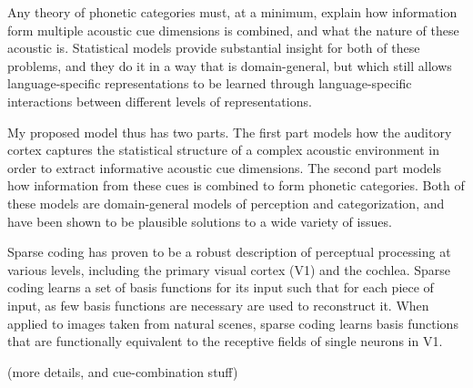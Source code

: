 \documentclass[12pt]{article}
\begin{document}

% 

Any theory of phonetic categories must, at a minimum, explain how information form multiple acoustic cue dimensions is combined, and what the nature of these acoustic is.  Statistical models provide substantial insight for both of these problems, and they do it in a way that is domain-general, but which still allows language-specific representations to be learned through language-specific interactions between different levels of representations.  

My proposed model thus has two parts.  The first part models how the auditory cortex captures the statistical structure of a complex acoustic environment in order to extract informative acoustic cue dimensions.  The second part models how information from these cues is combined to form phonetic categories.  Both of these models are domain-general models of perception and categorization, and have been shown to be plausible solutions to a wide variety of issues.

Sparse coding \cite{Olshausen1996} has proven to be a robust description of perceptual processing at various levels, including the primary visual cortex (V1) and the cochlea.  Sparse coding learns a set of basis functions for its input such that for each piece of input, as few basis functions are necessary are used to reconstruct it.  When applied to images taken from natural scenes, sparse coding learns basis functions that are functionally equivalent to the receptive fields of single neurons in V1.  

(more details, and cue-combination stuff)
\end{document}
